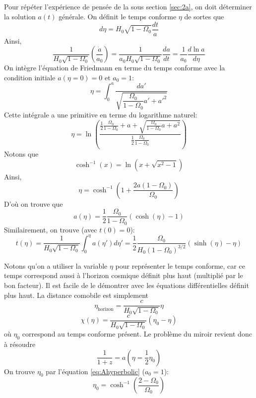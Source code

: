 \documentclass{article}
\numberwithin{equation}{section}
\begin{document}
\subsection{}
Pour répéter l'expérience de pensée de la sous section \ref{sec:2a}, on doit déterminer 
la solution $a(t)$ générale. On définit le temps conforme $\eta$ de sortes que 
\[
        d\eta = H_0\sqrt{1 - \Omega_0}\frac{dt}{a}
\]
Ainsi,
\[
        \frac{1}{H_0 \sqrt{1 - \Omega_0}} \left( \frac{\dot{a}}{a_0} \right) =
        \frac{1}{a_0 H_0 \sqrt{1 - \Omega_0}} \frac{da}{dt} = \frac{1}{a_0}\frac{d \ln a}{d\eta} 
\]
On intègre l'équation de Friedmann en terme du temps conforme avec la condition 
initiale $a(\eta = 0) = 0$ et $a_0 = 1$:
\[
        \eta = 
        \int_0^{a} \frac{d a'}{ \sqrt{\dfrac{\Omega_0}{1 - \Omega_0} a' + a'^2}}
\]
Cette intégrale a une primitive en terme du logarithme naturel:
\[
        \eta = 
        \ln \left( \frac{\frac{1}{2}\frac{\Omega_0}{1 - \Omega_0}  + a
                        + \sqrt{\frac{\Omega_0}{1 - \Omega_0} a + a^2}
        }{\frac{1}{2}\frac{\Omega_0}{1 -\Omega_0}} \right)
\]
Notons que
\[
        \cosh^{-1}(x) = \ln(x + \sqrt{x^{2} - 1})
\]
Ainsi,
\[
        \eta = 
        \cosh^{-1} \left( 1 + \frac{2a(1 - \Omega_0)}{\Omega_0} \right)
\]
D'où on trouve que 
\begin{equation}\label{eq:Ahyperbolic} 
        a(\eta) = \frac{1}{2} \frac{\Omega_0}{1 - \Omega_0}(\cosh (\eta) - 1)
\end{equation} 
Similairement, on trouve (avec $t(0) = 0$):
\begin{equation}\label{eq:thyperbolic} 
        t(\eta) =\frac{1}{H_0 \sqrt{1 - \Omega_0}} \int_0^{\eta}a(\eta')d\eta' = \frac{1}{2}\frac{\Omega_0}{
        H_0(1 - \Omega_0)^{3/2}} (\sinh(\eta) - \eta) 
\end{equation} 

Notons qu'on a utiliser la variable $\eta$ pour représenter le temps conforme, car ce temps 
correspond aussi à l'horizon cosmique définit plus haut (multiplié par le bon facteur). 
Il est facile de le démontrer 
avec les équations différentielles définit plus haut. La distance comobile est simplement
\[
        \eta_{\text{horizon}} = \frac{c}{H_0 \sqrt{1 - \Omega_0}} \eta
\]
\[
        \chi(\eta) = \frac{c}{H_0 \sqrt{1 - \Omega_0}} (\eta_0 - \eta)
\]
où $\eta_0$ correspond au temps conforme présent. Le problème du miroir revient donc à résoudre 
\[
        \frac{1}{1 + z} = a(\eta = \frac{1}{2}\eta_0)
\]
On trouve $\eta_0$ par l'équation \eqref{eq:Ahyperbolic} ($a_0 = 1$):
\[
        \eta_0 = \cosh^{-1} \left( \frac{2 - \Omega_0}{ \Omega_0} \right)
\]
\end{document}
